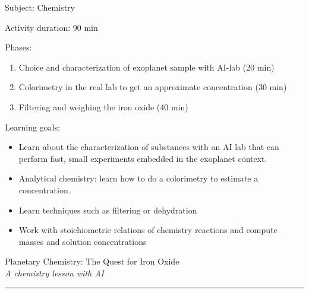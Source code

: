\documentclass[12pt]{article}
\begin{document}
\vspace*{0.5\textheight}

Subject: Chemistry


\vspace{0.3cm}

Activity duration: 90 min

\vspace{0.5cm}

Phases:
\begin{enumerate}
    \item Choice and characterization of exoplanet sample with AI-lab (20 min)
    \item Colorimetry in the real lab to get an approximate concentration (30 min)
    \item Filtering and weighing the iron oxide (40 min)
\end{enumerate}

Learning goals:

\begin{itemize}
    \item Learn about the characterization of substances with an AI lab that can perform fast, small experiments embedded in the exoplanet context.
\item Analytical chemistry: learn how to do a colorimetry to estimate a concentration.
\item Learn techniques such as filtering or dehydration 
\item Work with stoichiometric relations of chemistry reactions and compute masses and solution concentrations


\end{itemize}

\newpage

\begin{center}
    {\LARGE \color{maincolor} Planetary Chemistry: The Quest for Iron Oxide}\\[5pt]
    {\large \textit{A chemistry lesson with AI}}\\
    \rule{\linewidth}{1pt}
\end{center}

\vspace{0.5cm}
\end{document}
